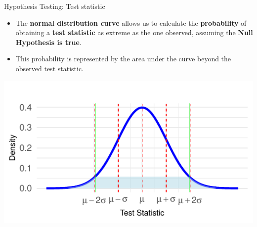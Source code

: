 \documentclass[
  ignorenonframetext,
]{beamer}
\providecommand{\tightlist}{%
  \setlength{\itemsep}{0pt}\setlength{\parskip}{0pt}}
\begin{document}
\begin{frame}{Hypothesis Testing: Test statistic}
\label{hypothesis-testing-test-statistic-1}
\begin{itemize}
\tightlist
\item
  The \textbf{normal distribution curve} allows us to calculate the
  \textbf{probability} of obtaining a \textbf{test statistic} as extreme
  as the one observed, assuming the \textbf{Null Hypothesis is true}.
\end{itemize}

\begin{itemize}
\tightlist
\item
  This probability is represented by the area under the curve beyond the
  observed test statistic.
\end{itemize}

\includegraphics{M5-Hypothesis-Testing,-Probability-and-Distribution_files/figure-beamer/unnamed-chunk-8-1.pdf}
\end{frame}
\end{document}
